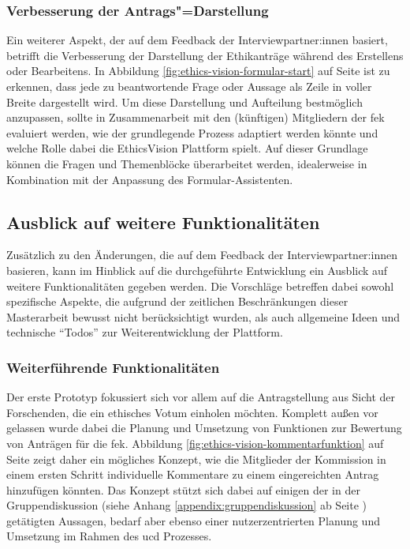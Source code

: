 \documentclass[a4paper,12pt,twoside]{scrreprt}
\begin{document}
\subsubsection*{Verbesserung der Antrags"=Darstellung}
\label{sub-sub-sec:verbesserung-antrags-darstellung}

Ein weiterer Aspekt, der auf dem Feedback der Interviewpartner:innen basiert, betrifft die Verbesserung der Darstellung der Ethikanträge während des Erstellens oder Bearbeitens. In Abbildung \ref{fig:ethics-vision-formular-start} auf Seite \pageref{fig:ethics-vision-formular-start} ist zu erkennen, dass jede zu beantwortende Frage oder Aussage als Zeile in voller Breite dargestellt wird. Um diese Darstellung und Aufteilung bestmöglich anzupassen, sollte in Zusammenarbeit mit den (künftigen) Mitgliedern der \ac{fek} evaluiert werden, wie der grundlegende Prozess adaptiert werden könnte und welche Rolle dabei die EthicsVision Plattform spielt. Auf dieser Grundlage können die Fragen und Themenblöcke überarbeitet werden, idealerweise in Kombination mit der Anpassung des Formular-Assistenten.

\subsection{Ausblick auf weitere Funktionalitäten}
\label{sub-sec:ausblick-weitere-funktionalitäten}

Zusätzlich zu den Änderungen, die auf dem Feedback der Interviewpartner:innen basieren, kann im Hinblick auf die durchgeführte Entwicklung ein Ausblick auf weitere Funktionalitäten gegeben werden. Die Vorschläge betreffen dabei sowohl spezifische Aspekte, die aufgrund der zeitlichen Beschränkungen dieser Masterarbeit bewusst nicht berücksichtigt wurden, als auch allgemeine Ideen und technische \enquote{Todos} zur Weiterentwicklung der Plattform.

\subsubsection*{Weiterführende Funktionalitäten}

Der erste Prototyp fokussiert sich vor allem auf die Antragstellung aus Sicht der Forschenden, die ein ethisches Votum einholen möchten. Komplett außen vor gelassen wurde dabei die Planung und Umsetzung von Funktionen zur Bewertung von Anträgen für die \acl{fek}. Abbildung \ref{fig:ethics-vision-kommentarfunktion} auf Seite \pageref{fig:ethics-vision-kommentarfunktion} zeigt daher ein mögliches Konzept, wie die Mitglieder der Kommission in einem ersten Schritt individuelle Kommentare zu einem eingereichten Antrag hinzufügen könnten. Das Konzept stützt sich dabei auf einigen der in der Gruppendiskussion (siehe Anhang \ref{appendix:gruppendiskussion} ab Seite \pageref{appendix:gruppendiskussion}) getätigten Aussagen, bedarf aber ebenso einer nutzerzentrierten Planung und Umsetzung im Rahmen des \ac{ucd} Prozesses.
\end{document}
